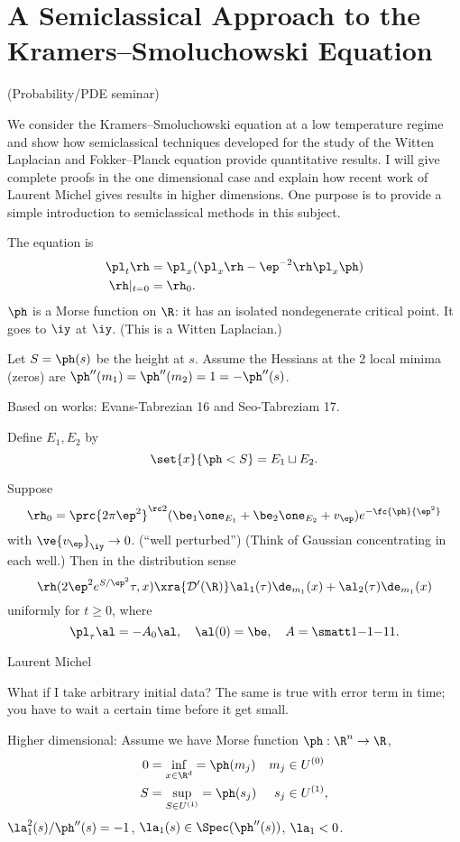\section{A Semiclassical Approach to the Kramers–Smoluchowski Equation}

(Probability/PDE seminar)

We consider the Kramers–Smoluchowski equation at a low temperature regime and show how semiclassical techniques developed for the study of the Witten Laplacian and Fokker–Planck equation provide quantitative results. I will give complete proofs in the one dimensional case and explain how recent work of Laurent Michel gives results in higher dimensions. One purpose is to provide a simple introduction to semiclassical methods in this subject.

The equation is
\begin{align}
\pl_t \rh &= \pl_x (\pl_x \rh - \ep^{-2} \rh \pl_x\ph)\\
\rh|_{t=0}&= \rh_0.
\end{align}
$\ph$ is a Morse function on $\R$: it has an isolated nondegenerate critical point. It goes to $\iy$ at $\iy$.
(This is a Witten Laplacian.) %

Let $S=\ph(s)$ be the height at $s$. Assume the Hessians at the 2 local minima (zeros) are $\ph''(m_1)=\ph''(m_2) = 1 = -\ph''(s)$. 

Based on works: Evans-Tabrezian 16 and Seo-Tabreziam 17.

Define $E_1,E_2$ by
$$
\set{x}{\ph<S} = E_1\sqcup E_2.
$$
\begin{thm}
Suppose 
$$
\rh_0 = \prc{2\pi \ep^2}^{\rc2} (\be_1\one_{E_1} + \be_2\one_{E_2} + v_\ep) e^{-\fc{\ph}{\ep^2}}
$$
with $\ve{v_\ep}_\iy\to 0$.
(``well perturbed'') (Think of Gaussian concentrating in each well.)
Then in the distribution sense
$$
\rh(2\ep^2 e^{S/\ep^2}\tau, x) \xra{\cal D'(\R)} \al_1(\tau) \de_{m_1}(x) + \al_2(\tau) \de_{m_1}(x)
$$
uniformly for $t\ge 0$, where
$$
\pl_\tau \al = -A_0\al, \quad \al(0)=\be, \quad A=\smatt 1{-1}{-1}1.
$$
\end{thm}

Laurent Michel

What if I take arbitrary initial data? The same is true with error term in time; you have to wait a certain time before it get small.

Higher dimensional: 
Assume we have Morse function $\ph:\R^n\to \R$, 
\begin{align}
0&=\inf_{x\in \R^d} = \ph(m_j)&m_j&\in U^{(0)}\\
S&=\sup_{S\in U^{(1)}} = \ph(s_j)&s_j&\in U^{(1)},
\end{align}
$\la_1^2(s)/\ph''(s) = -1$, $\la_1(s) \in \Spec(\ph''(s))$, $\la_1<0$.

